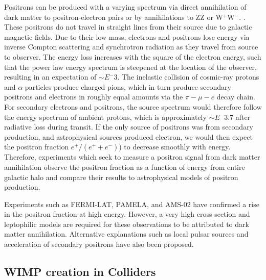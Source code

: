 \documentclass[a4paper,12pt]{article}
\begin{document}
Positrons can be produced with a varying spectrum via direct annihilation of dark matter to positron-electron pairs or by annihilations to ZZ or W$^+$W$^-$.  \cite{Cheng,Kamionkowsk}.  These positrons do not travel in straight lines from their source due to galactic magnetic fields.  Due to their low mass, electrons and positrons lose energy via inverse Compton scattering and synchrotron radiation as they travel from source to observer. The energy loss increases with the square of the electron energy, such that the power law energy spectrum is steepened at the location of the observer, resulting in an expectation of $\sim E^-3$.  The inelastic collision of cosmic-ray protons and $\alpha$-particles produce charged pions, which in turn produce secondary positrons and electrons in roughly equal amounts via the $\pi-\mu-e$ decay chain. \cite{Stecker}  For secondary electrons and positrons, the source spectrum would therefore follow the energy spectrum of ambient protons, which is approximately $\sim E^-3.7$ after radiative loss during transit.  If the only source of positrons was from secondary production, and astrophysical sources produced electron, we would then expect the positron fraction $e^+/(e^+ + e^-)$) to decrease smoothly with energy.  \cite{PEBS} Therefore, experiments which seek to measure a positron signal from dark matter annihilation observe the positron fraction as a function of energy from entire galactic halo and compare their results to astrophysical models of positron production.

Experiments such as FERMI-LAT, PAMELA, and AMS-02 have confirmed a rise in the positron fraction at high energy. \cite{FermiPositron,PamelaPositron,AMSPositron} However, a very high cross section and leptophilic models are required for these observations to be attributed to dark matter annihilation.  Alternative explanations such as local pulsar sources and acceleration of secondary positrons have also been proposed. \cite{Serpico}



\subsection{WIMP creation in Colliders}
\end{document}
